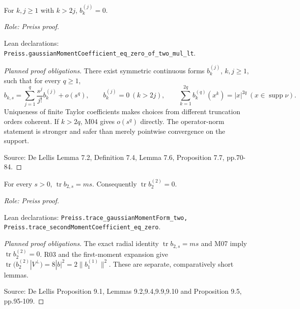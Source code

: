\begin{lemma}
\label{lem:moment-coefficient-vanishing}







For $k,j\geq1$ with $k>2j$, $b_k^{(j)}=0$.
\par\emph{Role: Preiss proof.}
\par Lean declarations: \texttt{Preiss.gaussianMomentCoefficient\_eq\_zero\_of\_two\_mul\_lt}.
\end{lemma}
\begin{proof}[Planned proof obligations]

There exist symmetric continuous forms $b_k^{(j)}$, $k,j\geq1$, such that for
every $q\geq1$,
\[
 b_{k,s}=\sum_{j=1}^{q}\frac{s^j}{j!}b_k^{(j)}+o(s^q),\qquad
 b_k^{(j)}=0\ (k>2j),\qquad
 \sum_{k=1}^{2q}b_k^{(q)}(x^k)=|x|^{2q}\ (x\in\operatorname{supp}\nu).
\]
Uniqueness of finite Taylor coefficients makes choices from different truncation
orders coherent. If $k>2q$, M04 gives $o(s^q)$ directly. The operator-norm
statement is stronger and safer than merely pointwise convergence on the support.
\par Source: De Lellis Lemma 7.2, Definition 7.4, Lemma 7.6, Proposition 7.7, pp.70-84.
\end{proof}

\begin{lemma}
\label{lem:moment-second-total-trace}






For every $s>0$, $\operatorname{tr}b_{2,s}=ms$. Consequently $\operatorname{tr}b_2^{(2)}=0$.
\par\emph{Role: Preiss proof.}
\par Lean declarations: \texttt{Preiss.trace\_gaussianMomentForm\_two, Preiss.trace\_secondMomentCoefficient\_eq\_zero}.
\end{lemma}
\begin{proof}[Planned proof obligations]

The exact radial identity $\operatorname{tr}b_{2,s}=ms$ and M07 imply
$\operatorname{tr}b_2^{(2)}=0$.
R03 and the first-moment expansion give
$\operatorname{tr}(b_2^{(2)}|V^\perp)=8|b|^2
=2\|b_1^{(1)}\|^2$.
These are separate, comparatively short lemmas.
\par Source: De Lellis Proposition 9.1, Lemmas 9.2,9.4,9.9,9.10 and Proposition 9.5, pp.95-109.
\end{proof}

